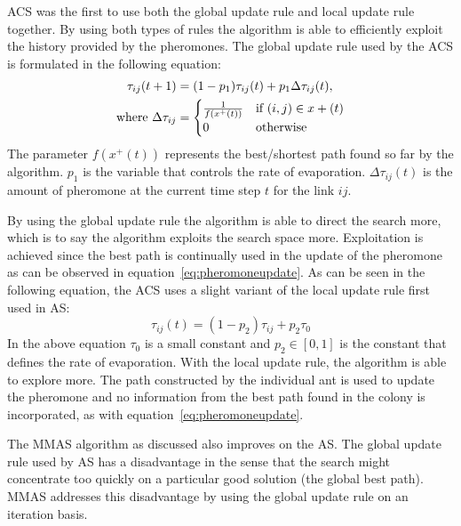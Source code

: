 \gls{ACS} was the first to use both the global update rule and local update rule together\cite{CompuIntelligenceIntro}. By using both types of rules the algorithm is able to efficiently exploit the history provided by the pheromones\cite{CompuIntelligenceIntro}. The global update rule used by the \gls{ACS} is formulated in the following equation\cite{CompuIntelligenceIntro}:
\begin{align}
\label{eq:pheromoneupdate}
	\tau_{ij}(t + 1) &= (1 - p_1)\tau_{ij}(t) + p_1\Delta\tau_{ij}(t),\\
	\text{where }\Delta\tau_{ij} &= \notag
	\begin{cases}
		\frac{1}{f(x^+(t))} &\text{if $(i,j) \in x+(t)$}\\
		0 &\text{otherwise}
	\end{cases}
\end{align}
The parameter $f(x^+(t))$ represents the best/shortest path found so far by the algorithm\cite{CompuIntelligenceIntro}. $p_1$ is the variable that controls the rate of evaporation. $\Delta\tau_{ij}(t)$ is the amount of pheromone at the current time step $t$ for the link $ij$.

By using the global update rule the algorithm is able to direct the search more, which is to say the algorithm exploits the search space more. Exploitation is achieved since the best path is continually used in the update of the pheromone as can be observed in equation~\ref{eq:pheromoneupdate}\cite{CompuIntelligenceIntro,FundamentalSwarm}.
As can be seen in the following equation, the \gls{ACS} uses a slight variant of the local update rule first used in \gls{AS}\cite{CompuIntelligenceIntro}:
\begin{equation}
	\tau_{ij}(t) = (1 - p_2)\tau_{ij} + p_2\tau_0
\end{equation}
In the above equation $\tau_0$ is a small constant and $p_2 \in [0,1]$ is the constant that defines the rate of evaporation\cite{CompuIntelligenceIntro}. With the local update rule, the algorithm is able to explore more. The path constructed by the individual ant is used to update the pheromone and no information from the best path found in the colony is incorporated, as with equation~\ref{eq:pheromoneupdate}\cite{CompuIntelligenceIntro,FundamentalSwarm}.

The \gls{MMAS} algorithm as discussed also improves on the \gls{AS}. The global update rule used by \gls{AS} has a disadvantage in the sense that the search might concentrate too quickly on a particular good solution (the global best path)\cite{FundamentalSwarm}. \gls{MMAS} addresses this disadvantage by using the global update rule on an iteration basis\cite{FundamentalSwarm}.

